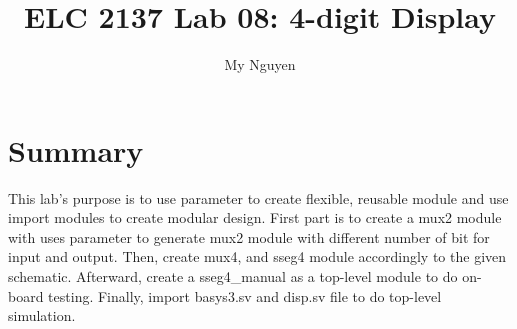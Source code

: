 \documentclass[11pt]{article}
\begin{document}
\title{ELC 2137 Lab 08: 4-digit Display}
\author{My Nguyen}

\maketitle

\section*{Summary}
This lab's purpose is to use parameter to create flexible, reusable module and use import modules to create modular design. First part is to create a mux2 module with uses parameter to generate mux2 module with different number of bit for input and output. Then, create mux4, and sseg4 module accordingly to the given schematic. Afterward, create a sseg4\_manual as a top-level module to do on-board testing. Finally, import basys3.sv and disp.sv file to do top-level simulation.
\end{document}

